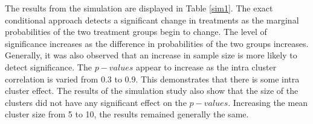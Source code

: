 \documentclass[12pt,oneside]{report}
\theoremstyle{definition}
\theoremstyle{mystyle}
\begin{document}
The results from the simulation are displayed in Table \ref{sim1}. The exact conditional approach detects a significant change in treatments as the marginal probabilities of the two treatment groups begin to change. The level of significance increases as the  difference in probabilities of the two groups increases. Generally, it was also observed that an increase in sample size is more likely to detect significance. The $p-values$ appear to increase as the intra cluster correlation is varied from $0.3$ to $0.9$. This demonstrates that there is some intra cluster effect. The results of the simulation study also show that the size of the clusters did not have any significant effect on the $p-values$. Increasing the mean cluster size from 5 to 10, the results remained generally the same.


\end{document}
